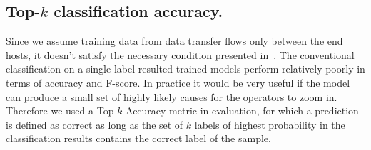 \subsection{Top-$k$ classification accuracy.} 
Since we assume training data from data transfer flows only between the end hosts, it doesn't satisfy the necessary condition presented in~\cite{netbouncer:nsdi18}. The conventional classification on a single label resulted trained models perform relatively poorly in terms of accuracy and F-score. In practice it would be very useful if the model can produce a small set of highly likely causes for the operators to zoom in. Therefore we used a Top-$k$ Accuracy metric in evaluation, for which a prediction is defined as correct as long as the set of $k$ labels of highest probability in the classification results contains the correct label of the sample.
